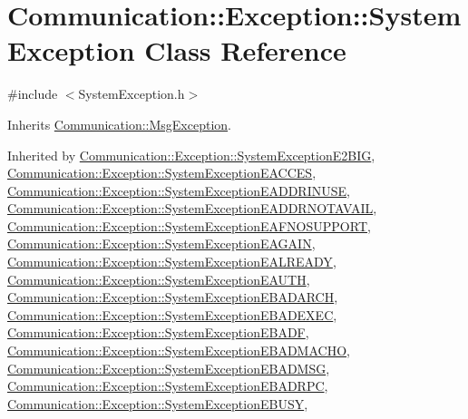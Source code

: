 \hypertarget{class_communication_1_1_exception_1_1_system_exception}{}\section{Communication\+:\+:Exception\+:\+:System\+Exception Class Reference}
\label{class_communication_1_1_exception_1_1_system_exception}


{\ttfamily \#include $<$System\+Exception.\+h$>$}



Inherits \hyperlink{class_communication_1_1_msg_exception}{Communication\+::\+Msg\+Exception}.



Inherited by \hyperlink{class_communication_1_1_exception_1_1_system_exception_e2_b_i_g}{Communication\+::\+Exception\+::\+System\+Exception\+E2\+B\+I\+G}, \hyperlink{class_communication_1_1_exception_1_1_system_exception_e_a_c_c_e_s}{Communication\+::\+Exception\+::\+System\+Exception\+E\+A\+C\+C\+E\+S}, \hyperlink{class_communication_1_1_exception_1_1_system_exception_e_a_d_d_r_i_n_u_s_e}{Communication\+::\+Exception\+::\+System\+Exception\+E\+A\+D\+D\+R\+I\+N\+U\+S\+E}, \hyperlink{class_communication_1_1_exception_1_1_system_exception_e_a_d_d_r_n_o_t_a_v_a_i_l}{Communication\+::\+Exception\+::\+System\+Exception\+E\+A\+D\+D\+R\+N\+O\+T\+A\+V\+A\+I\+L}, \hyperlink{class_communication_1_1_exception_1_1_system_exception_e_a_f_n_o_s_u_p_p_o_r_t}{Communication\+::\+Exception\+::\+System\+Exception\+E\+A\+F\+N\+O\+S\+U\+P\+P\+O\+R\+T}, \hyperlink{class_communication_1_1_exception_1_1_system_exception_e_a_g_a_i_n}{Communication\+::\+Exception\+::\+System\+Exception\+E\+A\+G\+A\+I\+N}, \hyperlink{class_communication_1_1_exception_1_1_system_exception_e_a_l_r_e_a_d_y}{Communication\+::\+Exception\+::\+System\+Exception\+E\+A\+L\+R\+E\+A\+D\+Y}, \hyperlink{class_communication_1_1_exception_1_1_system_exception_e_a_u_t_h}{Communication\+::\+Exception\+::\+System\+Exception\+E\+A\+U\+T\+H}, \hyperlink{class_communication_1_1_exception_1_1_system_exception_e_b_a_d_a_r_c_h}{Communication\+::\+Exception\+::\+System\+Exception\+E\+B\+A\+D\+A\+R\+C\+H}, \hyperlink{class_communication_1_1_exception_1_1_system_exception_e_b_a_d_e_x_e_c}{Communication\+::\+Exception\+::\+System\+Exception\+E\+B\+A\+D\+E\+X\+E\+C}, \hyperlink{class_communication_1_1_exception_1_1_system_exception_e_b_a_d_f}{Communication\+::\+Exception\+::\+System\+Exception\+E\+B\+A\+D\+F}, \hyperlink{class_communication_1_1_exception_1_1_system_exception_e_b_a_d_m_a_c_h_o}{Communication\+::\+Exception\+::\+System\+Exception\+E\+B\+A\+D\+M\+A\+C\+H\+O}, \hyperlink{class_communication_1_1_exception_1_1_system_exception_e_b_a_d_m_s_g}{Communication\+::\+Exception\+::\+System\+Exception\+E\+B\+A\+D\+M\+S\+G}, \hyperlink{class_communication_1_1_exception_1_1_system_exception_e_b_a_d_r_p_c}{Communication\+::\+Exception\+::\+System\+Exception\+E\+B\+A\+D\+R\+P\+C}, \hyperlink{class_communication_1_1_exception_1_1_system_exception_e_b_u_s_y}{Communication\+::\+Exception\+::\+System\+Exception\+E\+B\+U\+S\+Y}, 